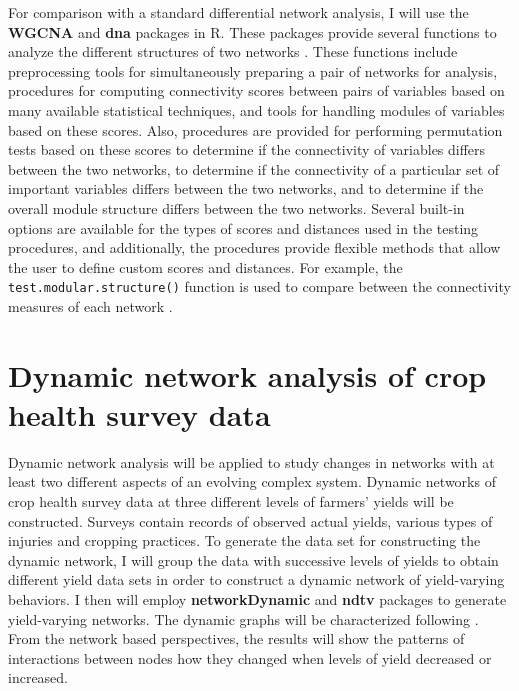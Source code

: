 For comparison with a standard differential network analysis, I will use the \textbf{WGCNA} \citep{horvath2011weighted} and \textbf{dna} \citep{dnapackage} packages in \textsf{R}. These packages provide several functions to analyze the different structures of two networks \citep{horvath2011weighted}. These functions include preprocessing tools for simultaneously preparing a pair of networks for analysis, procedures for computing connectivity scores between pairs of variables based on many available statistical techniques, and tools for handling modules of variables based on these scores. Also, procedures are provided for performing permutation tests based on these scores to determine if the connectivity of variables differs between the two networks, to determine if the connectivity of a particular set of important variables differs between the two networks, and to determine if the overall module structure differs between the two networks. Several built-in options are available for the types of scores and distances used in the testing procedures, and additionally, the procedures provide flexible methods that allow the user to define custom scores and distances. For example, the \texttt{test.modular.structure()} function is used to compare between the connectivity measures of each network \citep{dnapackage}.
 
\section*{Dynamic network analysis of crop health survey data}

Dynamic network analysis will be applied to study changes in networks with at least two different aspects of an evolving complex system. Dynamic networks of crop health survey data at three different levels of farmers' yields will be constructed. Surveys contain records of observed actual yields, various types of injuries and cropping practices. To generate the data set for constructing the dynamic network, I will group the data with successive levels of yields to obtain different yield data sets in order to construct a dynamic network of yield-varying behaviors. I then will employ \textbf{networkDynamic} \citep{networkdynamicpackage} and \textbf{ndtv} \citep{ndtvpackage} packages to generate yield-varying networks. The dynamic graphs will be characterized following \citep{bilgin2006dynamic, kolaczyk2014statistical}. From the network based perspectives, the results will show the patterns of interactions between nodes how they changed when levels of yield decreased or increased.

